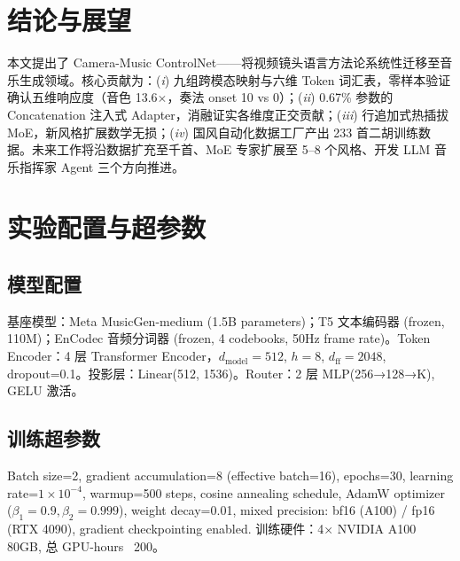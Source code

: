 \documentclass[11pt,twocolumn]{article}
\begin{document}
\section{结论与展望}

本文提出了 Camera-Music ControlNet——将视频镜头语言方法论系统性迁移至音乐生成领域。核心贡献为：(\textit{i}) 九组跨模态映射与六维 Token 词汇表，零样本验证确认五维响应度（音色 13.6$\times$，奏法 onset 10 vs 0）；(\textit{ii}) 0.67\% 参数的 Concatenation 注入式 Adapter，消融证实各维度正交贡献；(\textit{iii}) 行追加式热插拔 MoE，新风格扩展数学无损；(\textit{iv}) 国风自动化数据工厂产出 233 首二胡训练数据。未来工作将沿数据扩充至千首、MoE 专家扩展至 5--8 个风格、开发 LLM 音乐指挥家 Agent 三个方向推进。


\newpage
\appendix
\section{实验配置与超参数}

\subsection{模型配置}
基座模型：Meta MusicGen-medium (1.5B parameters)；T5 文本编码器 (frozen, 110M)；EnCodec 音频分词器 (frozen, 4 codebooks, 50Hz frame rate)。Token Encoder：4 层 Transformer Encoder，$d_{\text{model}}=512$, $h=8$, $d_{\text{ff}}=2048$, dropout=0.1。投影层：Linear(512, 1536)。Router：2 层 MLP(256→128→K), GELU 激活。

\subsection{训练超参数}
Batch size=2, gradient accumulation=8 (effective batch=16), epochs=30, learning rate=$1\times10^{-4}$, warmup=500 steps, cosine annealing schedule, AdamW optimizer ($\beta_1=0.9,\beta_2=0.999$), weight decay=0.01, mixed precision: bf16 (A100) / fp16 (RTX 4090), gradient checkpointing enabled. 训练硬件：4× NVIDIA A100 80GB, 总 GPU-hours ~200。
\end{document}
